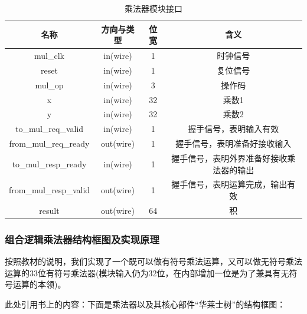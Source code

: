 \documentclass[11pt]{article}
\begin{document}
\begin{table}[H]
    \centering
    \begin{tabular}{cccc}\hline
        名称                & 方向与类型 & 位宽 & 含义                                    \\ \hline
        mul_clk             & in(wire)   & 1    & 时钟信号                                \\
        reset               & in(wire)   & 1    & 复位信号                                \\ \hline
        mul_op              & in(wire)   & 3    & 操作码                                  \\
        x                   & in(wire)   & 32   & 乘数1                                   \\
        y                   & in(wire)   & 32   & 乘数2                                   \\\hline
        to_mul_req_valid    & in(wire)   & 1    & 握手信号，表明输入有效                  \\
        from_mul_req_ready  & out(wire)  & 1    & 握手信号，表明准备好接收输入            \\
        to_mul_resp_ready   & in(wire)   & 1    & 握手信号，表明外界准备好接收乘法器的输出\\
        from_mul_resp_valid & out(wire)  & 1    & 握手信号，表明运算完成，输出有效        \\ \hline
        result              & out(wire)  & 64   & 积                                      \\ \hline
    \end{tabular}
    \caption{乘法器模块接口}
\end{table}

\subsubsection{组合逻辑乘法器结构框图及实现原理}

按照教材的说明，我们实现了一个既可以做有符号乘法运算，又可以做无符号乘法运算的33位有符号乘法器(模块输入仍为32位，在内部增加一位是为了兼具有无符号运算的本领)。

此处引用书上的内容：下面是乘法器以及其核心部件“华莱士树”的结构框图：
\end{document}
